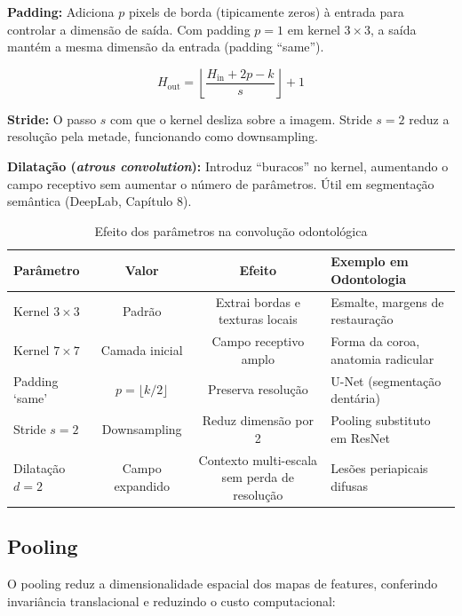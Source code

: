 \textbf{Padding:} Adiciona $p$ pixels de borda (tipicamente zeros) à entrada
para controlar a dimensão de saída. Com padding $p=1$ em kernel $3\times3$, a
saída mantém a mesma dimensão da entrada (padding ``same'').

\begin{equation}
  H_{\text{out}} = \left\lfloor \frac{H_{\text{in}} + 2p - k}{s} \right\rfloor + 1
  \label{eq:conv-output-size}
\end{equation}

\textbf{Stride:} O passo $s$ com que o kernel desliza sobre a imagem. Stride $s=2$
reduz a resolução pela metade, funcionando como downsampling.

\textbf{Dilatação (\textit{atrous convolution}):} Introduz ``buracos'' no kernel,
aumentando o campo receptivo sem aumentar o número de parâmetros. Útil em
segmentação semântica (DeepLab, Capítulo 8).

\begin{table}[H]
  \centering
  \caption{Efeito dos parâmetros na convolução odontológica}
  \label{tab:conv-params}
  \begin{tabularx}{\textwidth}{lccX}
    \toprule
    \textbf{Parâmetro} & \textbf{Valor} & \textbf{Efeito} & \textbf{Exemplo em Odontologia} \\
    \midrule
    Kernel $3 \times 3$ & Padrão & Extrai bordas e texturas locais & Esmalte, margens de restauração \\
    Kernel $7 \times 7$ & Camada inicial & Campo receptivo amplo & Forma da coroa, anatomia radicular \\
    Padding `same' & $p = \lfloor k/2 \rfloor$ & Preserva resolução & U-Net (segmentação dentária) \\
    Stride $s=2$ & Downsampling & Reduz dimensão por 2 & Pooling substituto em ResNet \\
    Dilatação $d=2$ & Campo expandido & Contexto multi-escala sem perda de resolução & Lesões periapicais difusas \\
    \bottomrule
  \end{tabularx}
\end{table}

\subsection{Pooling}

O pooling reduz a dimensionalidade espacial dos mapas de features, conferindo
invariância translacional e reduzindo o custo computacional:

